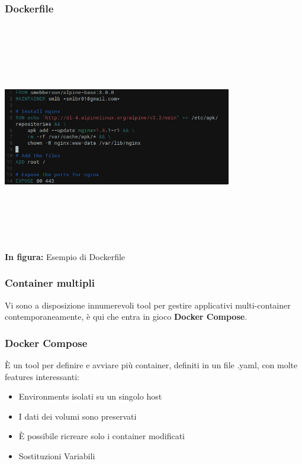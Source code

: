 \documentclass{beamer}
\begin{document}
\begin{frame}
    \frametitle{Dockerfile}
    \begin{center}
        \includegraphics[width=10cm,height=10cm,keepaspectratio]{dockerfile.png}
        \\ \textbf{In figura:} Esempio di Dockerfile
    \end{center}
\end{frame}


\begin{frame}
    \frametitle{Container multipli}
    Vi sono a disposizione innumerevoli tool per gestire applicativi multi-container contemporaneamente, \`e qui che entra in gioco \textbf{Docker Compose}.
\end{frame}


\begin{frame}
    \frametitle{Docker Compose}
    \`E un tool per definire e avviare pi\`u container, definiti in un file .yaml, con molte features interessanti:
    \begin{itemize}
        \item<1-> Environments isolati su un singolo host
        \item<2-> I dati dei volumi sono preservati
        \item<3-> \`E possibile ricreare solo i container modificati
        \item<4-> Sostituzioni Variabili
    \end{itemize}
\end{frame}
\end{document}
